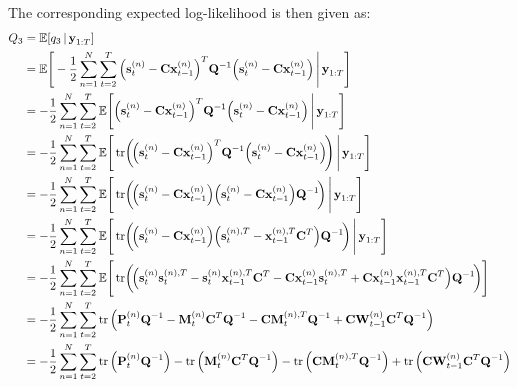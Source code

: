 		The corresponding expected log-likelihood is then given as:
		\begin{align*}
			Q_3
				&= \E[q_3 \given \vec{y}_{1:T}] \\
				&= \E\Bigg[ -\frac{1}{2} \sum_{n = 1}^{N} \sum_{t = 2}^{T} \Big(\vec{s}_t^{(n)} - \mat{C} \vec{x}_{t - 1}^{(n)}\Big)^T \mat{Q}^{-1} \Big(\vec{s}_t^{(n)} - \mat{C} \vec{x}_{t - 1}^{(n)}\Big) \Bigggiven \vec{y}_{1:T} \Bigg] \\
				&= -\frac{1}{2} \sum_{n = 1}^{N} \sum_{t = 2}^{T} \E\Bigg[ \Big(\vec{s}_t^{(n)} - \mat{C} \vec{x}_{t - 1}^{(n)}\Big)^T \mat{Q}^{-1} \Big(\vec{s}_t^{(n)} - \mat{C} \vec{x}_{t - 1}^{(n)}\Big) \Bigggiven \vec{y}_{1:T} \Bigg] \\
				&= -\frac{1}{2} \sum_{n = 1}^{N} \sum_{t = 2}^{T} \E\Bigg[ \tr\!\bigg(\! \Big(\vec{s}_t^{(n)} - \mat{C} \vec{x}_{t - 1}^{(n)}\Big)^T \mat{Q}^{-1} \Big(\vec{s}_t^{(n)} - \mat{C} \vec{x}_{t - 1}^{(n)}\Big) \!\Bigg) \Bigggiven \vec{y}_{1:T} \Bigg] \\
				&= -\frac{1}{2} \sum_{n = 1}^{N} \sum_{t = 2}^{T} \E\Bigg[ \tr\!\bigg(\! \Big(\vec{s}_t^{(n)} - \mat{C} \vec{x}_{t - 1}^{(n)}\Big) \Big(\vec{s}_t^{(n)} - \mat{C} \vec{x}_{t - 1}^{(n)}\Big) \mat{Q}^{-1} \!\bigg) \Bigggiven \vec{y}_{1:T} \Bigg] \\
				&= -\frac{1}{2} \sum_{n = 1}^{N} \sum_{t = 2}^{T} \E\Bigg[ \tr\!\bigg(\! \Big(\vec{s}_t^{(n)} - \mat{C} \vec{x}_{t - 1}^{(n)}\Big) \Big(\vec{s}_t^{(n), T} - \vec{x}_{t - 1}^{(n), T} \mat{C}^T\Big) \mat{Q}^{-1} \!\bigg) \Bigggiven \vec{y}_{1:T} \Bigg] \\
				&= -\frac{1}{2} \sum_{n = 1}^{N} \sum_{t = 2}^{T} \E\Bigg[ \tr\!\bigg(\! \Big( \vec{s}_t^{(n)} \vec{s}_t^{(n), T} - \vec{s}_t^{(n)} \vec{x}_{t - 1}^{(n), T} \mat{C}^T - \mat{C} \vec{x}_{t - 1}^{(n)} \vec{s}_t^{(n), T} + \mat{C} \vec{x}_{t - 1}^{(n)} \vec{x}_{t - 1}^{(n), T} \mat{C}^T \Big) \mat{Q}^{-1} \!\bigg) \Bigg] \\
				&= -\frac{1}{2} \sum_{n = 1}^{N} \sum_{t = 2}^{T} \tr\Big( \mat{P}_t^{(n)} \mat{Q}^{-1} - \mat{M}_t^{(n)} \mat{C}^T \mat{Q}^{-1} - \mat{C} \mat{M}_t^{(n), T} \mat{Q}^{-1} + \mat{C} \mat{W}_{t - 1}^{(n)} \mat{C}^T \mat{Q}^{-1} \Big) \\
				&= -\frac{1}{2} \sum_{n = 1}^{N} \sum_{t = 2}^{T} \tr\Big( \mat{P}_t^{(n)} \mat{Q}^{-1} \Big) - \tr\Big( \mat{M}_t^{(n)} \mat{C}^T \mat{Q}^{-1} \Big) - \tr\Big( \mat{C} \mat{M}_t^{(n), T} \mat{Q}^{-1} \Big) + \tr\Big( \mat{C} \mat{W}_{t - 1}^{(n)} \mat{C}^T \mat{Q}^{-1} \Big)
		\end{align*}
